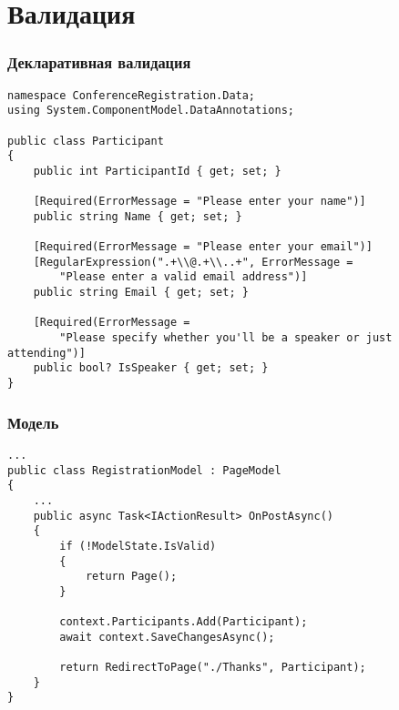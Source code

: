 \documentclass{../../slides-style}
\begin{document}
    \section{Валидация}

    \begin{frame}[fragile]
        \frametitle{Декларативная валидация}
        \begin{footnotesize}
            \begin{verbatim}
namespace ConferenceRegistration.Data;
using System.ComponentModel.DataAnnotations;

public class Participant
{
    public int ParticipantId { get; set; }

    [Required(ErrorMessage = "Please enter your name")]
    public string Name { get; set; }

    [Required(ErrorMessage = "Please enter your email")]
    [RegularExpression(".+\\@.+\\..+", ErrorMessage = 
        "Please enter a valid email address")]
    public string Email { get; set; }

    [Required(ErrorMessage = 
        "Please specify whether you'll be a speaker or just attending")]
    public bool? IsSpeaker { get; set; }
}
            \end{verbatim}
        \end{footnotesize}
    \end{frame}

    \begin{frame}[fragile]
        \frametitle{Модель}
        \begin{footnotesize}
            \begin{verbatim}
...
public class RegistrationModel : PageModel
{
    ...
    public async Task<IActionResult> OnPostAsync()
    {
        if (!ModelState.IsValid)
        {
            return Page();
        }

        context.Participants.Add(Participant);
        await context.SaveChangesAsync();

        return RedirectToPage("./Thanks", Participant);
    }
}
            \end{verbatim}
        \end{footnotesize}
    \end{frame}
\end{document}

